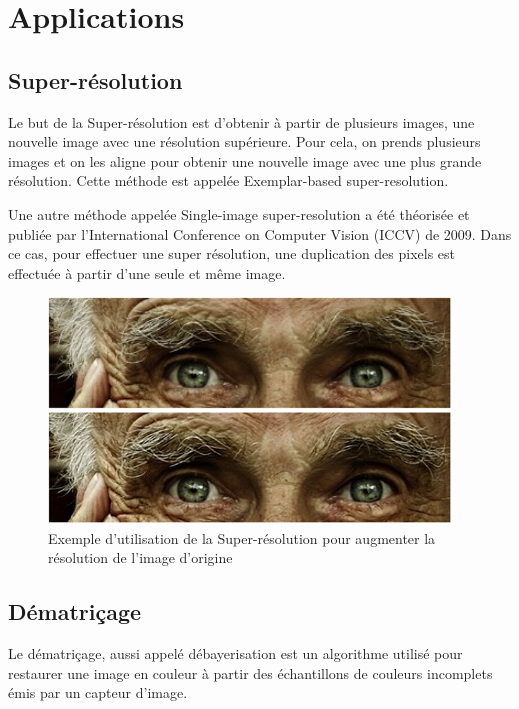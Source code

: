 \documentclass[]{article}
\begin{document}
\newpage

\hypertarget{applications}{%
\section{Applications}\label{applications}}

\hypertarget{super-ruxe9solution}{%
\subsection{Super-résolution}\label{super-ruxe9solution}}

Le but de la Super-résolution est d'obtenir à partir de plusieurs
images, une nouvelle image avec une résolution supérieure. Pour cela, on
prends plusieurs images et on les aligne pour obtenir une nouvelle image
avec une plus grande résolution. Cette méthode est appelée
Exemplar-based super-resolution.

Une autre méthode appelée Single-image super-resolution a été théorisée
et publiée par l'International Conference on Computer Vision (ICCV) de
2009. Dans ce cas, pour effectuer une super résolution, une duplication
des pixels est effectuée à partir d'une seule et même image.

\begin{figure}
\centering
    \includegraphics[height=6cm]{img/superresolution.png}
\caption{Exemple d'utilisation de la Super-résolution pour augmenter la
résolution de l'image d'origine}
\end{figure}


\hypertarget{duxe9matriuxe7age}{%
\subsection{Dématriçage}\label{duxe9matriuxe7age}}

Le dématriçage, aussi appelé débayerisation est un algorithme utilisé
pour restaurer une image en couleur à partir des échantillons de
couleurs incomplets émis par un capteur d'image.
\end{document}
